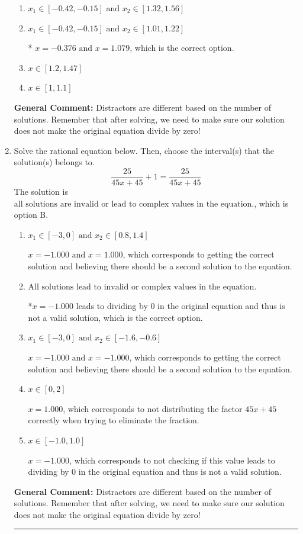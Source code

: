 \documentclass{extbook}[14pt]
\newcommand{\litem}[1]{\item #1

\rule{\textwidth}{0.4pt}}
\begin{document}
\begin{enumerate}
{\begin{enumerate}[label=\Alph*.]
\item \( x_1 \in [-0.42, -0.15] \text{ and } x_2 \in [1.32,1.56] \)


\item \( x_1 \in [-0.42, -0.15] \text{ and } x_2 \in [1.01,1.22] \)

* $x = -0.376 \text{ and } x = 1.079$, which is the correct option.
\item \( x \in [1.2,1.47] \)


\item \( x \in [1,1.1] \)


\end{enumerate}

\textbf{General Comment:} Distractors are different based on the number of solutions. Remember that after solving, we need to make sure our solution does not make the original equation divide by zero!
}
\litem{
Solve the rational equation below. Then, choose the interval(s) that the solution(s) belongs to.
\[ \frac{25}{45x + 45} + 1 = \frac{25}{45x + 45} \]The solution is \( \text{all solutions are invalid or lead to complex values in the equation.} \), which is option B.\begin{enumerate}[label=\Alph*.]
\item \( x_1 \in [-3, 0] \text{ and } x_2 \in [0.8,1.4] \)

$x = -1.000 \text{ and } x = 1.000$, which corresponds to getting the correct solution and believing there should be a second solution to the equation.
\item \( \text{All solutions lead to invalid or complex values in the equation.} \)

*$x = -1.000$ leads to dividing by 0 in the original equation and thus is not a valid solution, which is the correct option.
\item \( x_1 \in [-3, 0] \text{ and } x_2 \in [-1.6,-0.6] \)

$x = -1.000 \text{ and } x = -1.000$, which corresponds to getting the correct solution and believing there should be a second solution to the equation.
\item \( x \in [0,2] \)

$x = 1.000$, which corresponds to not distributing the factor $45x + 45$ correctly when trying to eliminate the fraction.
\item \( x \in [-1.0,1.0] \)

$x = -1.000$, which corresponds to not checking if this value leads to dividing by 0 in the original equation and thus is not a valid solution.
\end{enumerate}

\textbf{General Comment:} Distractors are different based on the number of solutions. Remember that after solving, we need to make sure our solution does not make the original equation divide by zero!
}
\end{enumerate}
\end{document}
